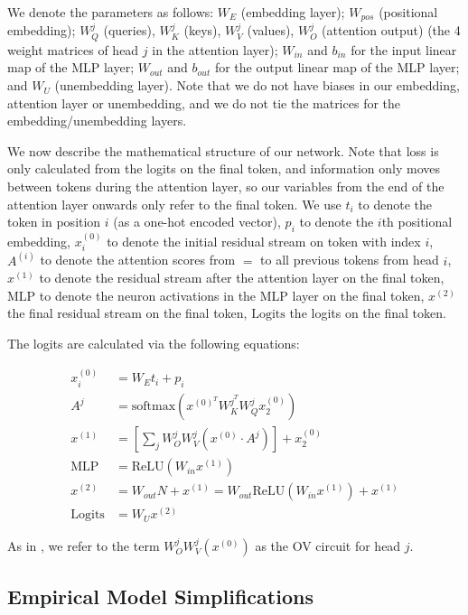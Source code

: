 \documentclass{article} %
\newcommand{\MLP}{\textrm{MLP}}
\begin{document}
We denote the parameters as follows: $W_E$ (embedding layer); $W_{pos}$ (positional embedding); $W_Q^j$ (queries), $W_K^j$ (keys), $W_V^j$ (values), $W_O^j$ (attention output) (the 4 weight matrices of head $j$ in the attention layer); $W_{in}$ and $b_{in}$ for the input linear map of the MLP layer; $W_{out}$ and $b_{out}$ for the output linear map of the MLP layer; and $W_U$ (unembedding layer). Note that we do not have biases in our embedding, attention layer or unembedding, and we do not tie the matrices for the embedding/unembedding layers.

We now describe the mathematical structure of our network. Note that loss is only calculated from the logits on the final token, and information only moves between tokens during the attention layer, so our variables from the end of the attention layer onwards only refer to the final token. We use $t_i$ to denote the token in position $i$ (as a one-hot encoded vector), $p_i$ to denote the $i$th positional embedding, $x^{(0)}_i$ to denote the initial residual stream on token with index $i$, $A^{(i)}$ to denote the attention scores from $=$ to all previous tokens from head $i$, $x^{(1)}$ to denote the residual stream after the attention layer on the final token, $\MLP$ to denote the neuron activations in the MLP layer on the final token, $x^{(2)}$ the final residual stream on the final token, $\textrm{Logits}$ the logits on the final token.

The logits are calculated via the following equations:

\begin{align*}
x_i^{(0)}&=W_Et_i + p_i\\
A^j &= \textrm{softmax}(x^{(0)^T} W_K^{j^T} W_Q^j x^{(0)}_2)\\
x^{(1)} &= [\sum_j W_O^j W_V^j (x^{(0)} \cdot A^j) ] + x^{(0)}_2\\
\MLP &= \textrm{ReLU}(W_{in} x^{(1)})\\
x^{(2)} &= W_{out} N + x^{(1)}= W_{out} \textrm{ReLU}( W_{in}x^{(1)}) + x^{(1)}\\
\textrm{Logits} &= W_U x^{(2)}
\end{align*}

As in \citet{elhage2021mathematical}, we refer to the term $W_O^j W_V^j (x^{(0)})$ as the OV circuit for head $j$.
\subsection{Empirical Model Simplifications}
\end{document}
